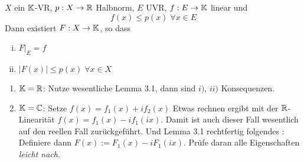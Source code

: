 	\begin{thm}
		$X$ ein $\mathbb{K}$-VR, $p: X \to \mathbb{R}$ Halbnorm, $E$ UVR, $f: E \to \mathbb{K}$ linear und
			$$ f(x) \leq p(x) \; \forall x \in E$$
	Dann existiert $F: X \to \mathbb{K}$, so dass 
		\begin{enumerate}[(i)]
			\item $F|_E = f$
			\item $|F(x)| \leq p(x) \; \forall x \in X$
		\end{enumerate}
	\end{thm}

	\begin{hinweise}
		\begin{enumerate}[{Fall} 1]
			\item $\mathbb{K} = \mathbb{R}$: Nutze wesentliche Lemma 3.1, dann sind $i)$, $ii)$ Konsequenzen.
			\item $\mathbb{K} = \mathbb{C}$: Setze $f(x) = f_1(x) + i f_2(x)$ Etwas rechnen ergibt mit der $\mathbb{R}$-Linearität 
				$f(x) = f_1(x) - i f_1(ix)$. Damit ist auch dieser Fall wesentlich auf den reellen Fall zurückgeführt. Und Lemma 3.1 rechtfertig folgendes :
				Definiere dann $F(x) := F_1(x) - i F_1(ix)$. Prüfe daran alle Eigenschaften \textit{leicht nach}.
		\end{enumerate}
	\end{hinweise}

